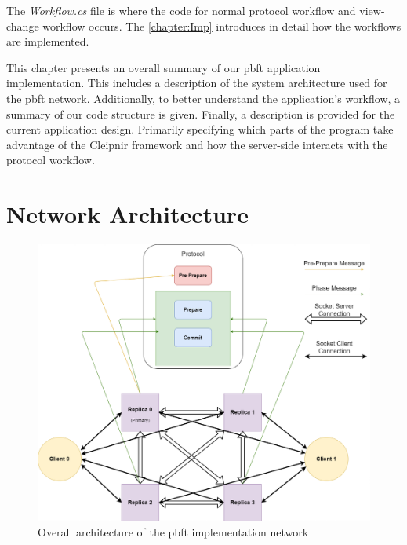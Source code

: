 The \emph{Workflow.cs} file is where the code for normal protocol workflow and view-change workflow occurs. The \autoref{chapter:Imp} introduces in detail how the workflows are implemented.
%
\fi

This chapter presents an overall summary of our \ac{pbft} application implementation. This includes a description of the system architecture used for the \ac{pbft} network. Additionally, to better understand the application’s workflow, a summary of our code structure is given. Finally, a description is provided for the current application design. Primarily specifying which parts of the program take advantage of the Cleipnir framework and how the server-side interacts with the protocol workflow.
\section{Network Architecture}
\begin{figure}
	\centering
	\includegraphics[width=\linewidth]{figures/meshnetwork}
	\caption{Overall architecture of the \ac{pbft} implementation network}
	\label{fig:meshnetwork}
\end{figure}
